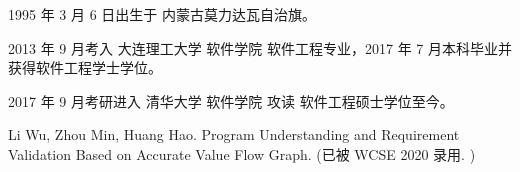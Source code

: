 
\begin{resume}


  1995 年 3 月 6 日出生于 内蒙古莫力达瓦自治旗。

  2013 年 9 月考入 大连理工大学 软件学院 软件工程专业，2017 年 7 月本科毕业并获得软件工程学士学位。

  2017 年 9 月考研进入 清华大学 软件学院 攻读 软件工程硕士学位至今。



  \begin{publications}[before=\publicationskip,after=\publicationskip]
    \item Li Wu, Zhou Min, Huang Hao. Program Understanding and Requirement Validation Based on Accurate Value Flow Graph. (已被 WCSE 2020 录用.  )
  \end{publications}



\end{resume}
